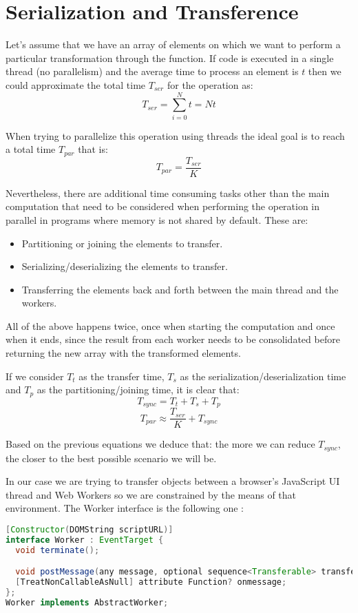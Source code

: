 \section{Serialization and Transference}
\label{sec:serialization-and-transference}

Let's assume that we have an array of  elements on which we want to perform a particular transformation through the  function. If code is executed in a single thread (no parallelism) and the average time to process an element is \(t\) then we could approximate the total time \(T_{ser}\) for the operation as:
\[T_{ser} = \sum_{i = 0}^{N}t = Nt\]

When trying to parallelize this operation using  threads the ideal goal is to reach a total time \(T_{par}\) that is:
\[T_{par} = \frac{T_{ser}}{K}\]

Nevertheless, there are additional time consuming tasks other than the main computation that need to be considered when performing the operation in parallel in programs where memory is not shared by default. These are:
\begin{itemize}
  \item Partitioning or joining the elements to transfer.
  \item Serializing/deserializing the elements to transfer.
  \item Transferring the elements back and forth between the main thread and the workers.
\end{itemize}

All of the above happens twice, once when starting the computation and once when it ends, since the result from each worker needs to be consolidated before returning the new array with the transformed elements.

If we consider \(T_{t}\) as the transfer time, \(T_{s}\) as the serialization/deserialization time and \(T_{p}\) as the partitioning/joining time, it is clear that:
\[T_{sync} = T_{t} + T_{s} + T_{p}\]
\[T_{par} \approx \frac{T_{ser}}{K} + T_{sync}\]

Based on the previous equations we deduce that: the more we can reduce \(T_{sync}\), the closer to the best possible scenario we will be.

In our case we are trying to transfer objects between a browser's JavaScript UI thread and Web Workers so we are constrained by the means of that environment. The Worker interface is the following one \cite{w3c-ww}:
\begin{lstlisting}[language=Java, caption=The Worker interface]
[Constructor(DOMString scriptURL)]
interface Worker : EventTarget {
  void terminate();

  void postMessage(any message, optional sequence<Transferable> transfer);
  [TreatNonCallableAsNull] attribute Function? onmessage;
};
Worker implements AbstractWorker;
\end{lstlisting}

